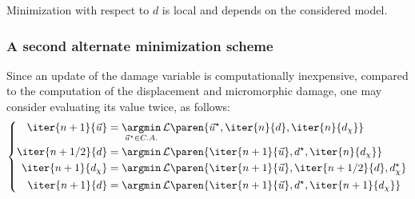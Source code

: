 
Minimization with respect to $d$ is local and depends on the considered model.

\subsubsection{A second alternate minimization scheme}

Since an update of the damage variable is computationally inexpensive,
compared to the computation of the displacement and micromorphic damage,
one may consider evaluating its value twice, as follows:
%
%
%
\begin{equation}
  \left\{
  \begin{aligned}
  \iter{n+1}{\vec{u}} &= \underset{\vec{u}^{\star}\in C.A.}{\argmin}\, \mathcal{L}\paren{\vec{u}^{\star},\iter{n}{d},\iter{n}{d_{\chi}}}\\
  \iter{n+1/2}{d} &= \argmin \,\mathcal{L}\paren{\iter{n+1}{\vec{u}},d^{\star},\iter{n}{d_{\chi}}} \\
  \iter{n+1}{d_{\chi}} &= \argmin \,\mathcal{L}\paren{\iter{n+1}{\vec{u}},\iter{n+1/2}{d},d_{\chi}^{\star}} \\
  \iter{n+1}{d} &= \argmin \,\mathcal{L}\paren{\iter{n+1}{\vec{u}},d^{\star},\iter{n+1}{d_{\chi}}} \\
  \end{aligned}
  \right.
\end{equation}

